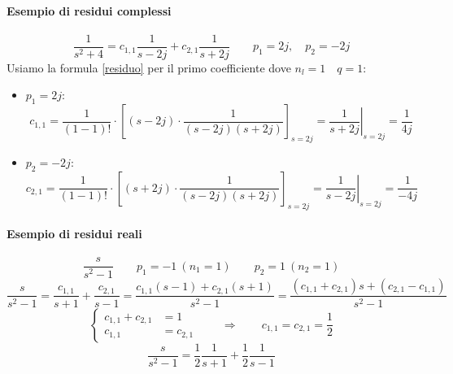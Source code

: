 \documentclass[../main.tex]{subfiles}
\begin{document}
		\begin{mdframed}[style=Esempio]
			\paragraph{Esempio di residui complessi}
			\[
				\frac{1}{s^2+4} = c_{1,1} \frac{1}{s-2j} + c_{2,1} \frac{1}{s+2j} \qquad p_1 = 2j,\quad p_2 = -2j
			\]
			Usiamo la formula \ref{residuo} per il primo coefficiente dove $ n_l = 1 \quad q = 1 $:
			\begin{itemize}
				\item $ p_1 = 2j $:
					\[ 
						c_{1,1} = \frac{1}{(1-1)!} \cdot \left[ (s-2j) \cdot \frac{1}{(s-2j)(s+2j)} \right]_{s=2j} = \left. \frac{1}{s+2j} \right|_{s=2j} = \frac{1}{4j}
					\]
				\item $ p_2 = -2j $:
					\[ 
						c_{2,1} = \frac{1}{(1-1)!} \cdot \left[ (s+2j) \cdot \frac{1}{(s-2j)(s+2j)} \right]_{s=2j} = \left. \frac{1}{s-2j} \right|_{s=2j} = \frac{1}{-4j}
					\]
			\end{itemize}
		\end{mdframed}

		\begin{mdframed}[style=Esempio]
			\paragraph{Esempio di residui reali}
			\[
				\frac{s}{s^2-1} \qquad p_1 = -1\ (n_1 = 1) \qquad p_2 = 1\ (n_2 = 1)
			\]
			\[
				\frac{s}{s^2-1} = \frac{c_{1,1}}{s+1}  + \frac{c_{2,1}}{s-1} = \frac{c_{1,1}(s-1) + c_{2,1}(s+1)}{s^2-1} = \frac{(c_{1,1} + c_{2,1})s + (c_{2,1} - c_{1,1})}{s^2-1}
			\]
			\[
				\begin{cases}
					c_{1,1} + c_{2,1} &= 1
					\\
					c_{1,1} &= c_{2,1}
				\end{cases}
				\qquad \Rightarrow \qquad c_{1,1} = c_{2,1} = \frac{1}{2}
			\]
			\[
				\frac{s}{s^2-1} = \frac{1}{2} \frac{1}{s+1} + \frac{1}{2} \frac{1}{s-1}
			\]
		\end{mdframed}
	
\end{document}
